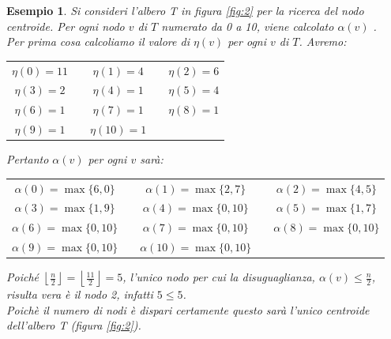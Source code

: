 \newtheorem{esempio}[definizione]{Esempio}
\begin{esempio}
	\label{es1}
Si consideri l'albero T in figura \ref{fig:2} per la ricerca del nodo centroide.
Per ogni nodo $ v $ di $ T $ numerato da 0 a 10,  viene calcolato $\alpha(v)$ . \\
Per prima cosa calcoliamo il valore di $ \eta(v) $ per ogni $ v $ di $ T $.
Avremo:
\begin{center} 
	\centering
	\begin{tabular}{ c c c c c}
		$ \eta(0) = 11 $ & & $ \eta(1)= 4 $ && $ \eta(2) = 6 $ \\
		$ \eta(3) = 2 $ & & $ \eta(4) = 1 $ && $ \eta(5) = 4 $ \\
		$ \eta(6) = 1 $ & & $ \eta(7) = 1 $ && $ \eta(8) = 1 $ \\
		$ \eta(9) = 1 $ & & $ \eta(10) = 1 $ \\
	\end{tabular}

	
	
\end{center}
Pertanto $ \alpha(v) $ per ogni $ v $ sarà: 
\begin{center}
	\centering
	\begin{tabular}{ c c c c c  }
		$\alpha(0) = \max\{6,0\}$ & & $\alpha(1) = \max\{2,7\}$ & & $\alpha(2) =\max\{4,5\} $ \\ 
		$\alpha(3) = \max\{1,9\}$ && $\alpha(4) =\max\{0,10\}$ &&  $\alpha(5) = \max\{1,7\}$ \\  
		$\alpha(6) = \max\{0,10\}$ && $\alpha(7) = \max\{0,10\}$ && $\alpha(8) = \max\{0,10\}$ \\
		$\alpha(9) = \max\{0,10\}$ && $\alpha(10) = \max\{0,10\}$ &&
	\end{tabular}
\end{center}

Poich\'e $ \left\lfloor\frac{n}{2} \right\rfloor = \left\lfloor \frac{11}{2} \right\rfloor = 5$, l'unico nodo per cui la disuguaglianza, $\alpha(v)\le\frac{n}{2}$, risulta vera \`e il nodo 2, infatti $5\le 5$.\\
Poich\`e il numero di nodi \`e dispari certamente questo sar\`a l'unico centroide dell'albero T (figura \ref{fig:2}). 
\demo
\end{esempio}\mbox{}\\


